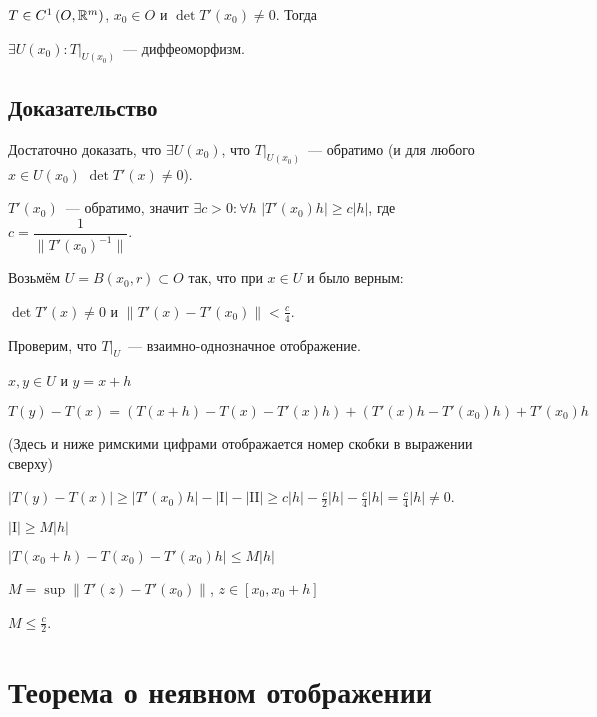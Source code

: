 \documentclass{article}
\begin{document}
        $T \in C^1 \left( O, \mathbb{R}^m \right)$, $x_0 \in O$ и $\det T'(x_0) \neq 0$. Тогда
        
        $\exists U(x_0) : T \big|_{U(x_0)}$~--- диффеоморфизм.
        
        \subsection{Доказательство}
        
            Достаточно доказать, что $\exists U(x_0)$, что $T \big|_{U(x_0)}$~--- обратимо (и для любого $x \in U(x_0)$ $\det T'(x) \neq 0$).
            
            $T'(x_0)$~--- обратимо, значит $\exists c > 0 : \forall h$ $\left| T'(x_0) h \right| \geq c |h|$, где $c = \dfrac{1}{\| T'(x_0)^{-1} \|}$.
            
            Возьмём $U = B(x_0, r) \subset O$ так, что при $x \in U$ и было верным:
            
                $\det T'(x) \neq 0$ и $\| T'(x) - T'(x_0) \| < \frac{c}{4}$.
                
            Проверим, что $T \big|_U$~--- взаимно-однозначное отображение.
            
            $x, y \in U$ и $y = x + h$
            
            $T(y) - T(x) = \left( T(x + h) - T(x) - T'(x) h \right) + \left( T'(x)h - T'(x_0)h \right) + T'(x_0)h$
        
            (Здесь и ниже римскими цифрами отображается номер скобки в выражении сверху)
            
            $\left| T(y) - T(x) \right| \geq \left| T'(x_0) h \right| - | \mathrm{I} | - | \mathrm{II} | \geq c |h| - \frac{c}{2} |h| - \frac{c}{4} |h| = \frac{c}{4} |h| \neq 0$.
            
            $| \mathrm{I} | \geq M |h|$
            
            $\left| T(x_0 + h) - T(x_0) - T'(x_0) h     \right| \leq M |h|$
            
            $M = \sup \| T'(z) - T'(x_0) \|$, $z \in [x_0, x_0 + h]$
            
            $M \leq \frac{c}{2}$.
            
    \newpage
    
    \section{Теорема о неявном отображении}
    
\end{document}
